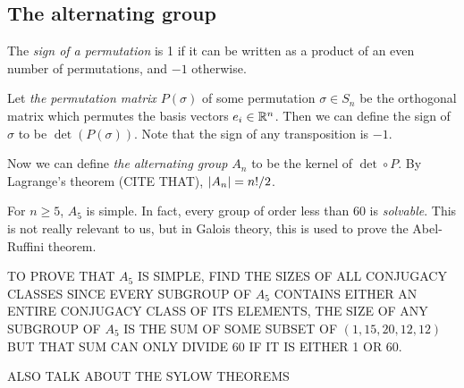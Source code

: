\documentclass[class=article, crop=false]{standalone}
\begin{document}
\subsection{The alternating group}
The \emph{sign of a permutation} is 1 if it can be written as a product of an even number of permutations, and $-1$ otherwise.
\par
Let \emph{the permutation matrix $P(\sigma)$} of some permutation $\sigma \in S_n$ be the orthogonal matrix which permutes the basis vectors $e_i \in \mathbb{R}^n$. Then we can define the sign of $\sigma$ to be $\det (P(\sigma))$. Note that the sign of any transposition is $-1$.
\begin{center}
\end{center}
Now we can define \emph{the alternating group $A_n$} to be the kernel of $\det \circ P$. By Lagrange's theorem (CITE THAT), $\left\lvert A_n \right\rvert=n!/2$.
\begin{prop}
    For $n \geq 5$, $A_5$ is simple. In fact, every group of order less than 60 is \emph{solvable}. This is not really relevant to us, but in Galois theory, this is used to prove the Abel-Ruffini theorem.
\end{prop}

TO PROVE THAT $A_5$ IS SIMPLE, FIND THE SIZES OF ALL CONJUGACY CLASSES SINCE EVERY SUBGROUP OF $A_5$ CONTAINS EITHER AN ENTIRE CONJUGACY CLASS OF ITS ELEMENTS, THE SIZE OF ANY SUBGROUP OF $A_5$ IS THE SUM OF SOME SUBSET OF $( 1, 15, 20,12,12) $ BUT THAT SUM CAN ONLY DIVIDE 60 IF IT IS EITHER 1 OR 60.
\par
ALSO TALK ABOUT THE SYLOW THEOREMS
\end{document}
